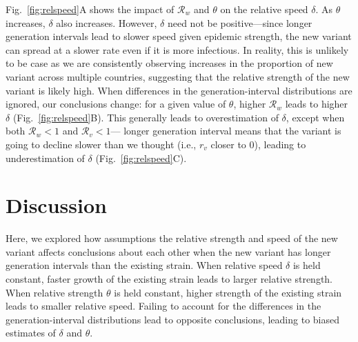 \documentclass[12pt]{article}
\newcommand{\fref}[1]{Fig.~\ref{fig:#1}}
\newcommand{\RR}{\ensuremath{{\mathcal R}}\xspace}
\begin{document}
\fref{relspeed}A shows the impact of $\RR_w$ and $\theta$ on the relative speed $\delta$.
As $\theta$ increases, $\delta$ also increases.
However, $\delta$ need not be positive---since longer generation intervals lead to slower speed given epidemic strength, the new variant can spread at a slower rate even if it is more infectious.
In reality, this is unlikely to be case as we are consistently observing increases in the proportion of new variant across multiple countries, suggesting that the relative strength of the new variant is likely high.
When differences in the generation-interval distributions are ignored, our conclusions change: for a given value of $\theta$, higher $\RR_w$ leads to higher $\delta$ (\fref{relspeed}B).
This generally leads to overestimation of $\delta$, except when both $\RR_w < 1$ and $\RR_v < 1$---
longer generation interval means that the variant is going to decline slower than we thought (i.e., $r_v$ closer to 0), leading to underestimation of $\delta$ (\fref{relspeed}C).

\section{Discussion}

Here, we explored how assumptions the relative strength and speed of the new variant affects conclusions about each other when the new variant has longer generation intervals than the existing strain.
When relative speed $\delta$ is held constant, faster growth of the existing strain leads to larger relative strength.
When relative strength $\theta$ is held constant, higher strength of the existing strain leads to smaller relative speed.
Failing to account for the differences in the generation-interval distributions lead to opposite conclusions, leading to biased estimates of $\delta$ and $\theta$.
\end{document}
